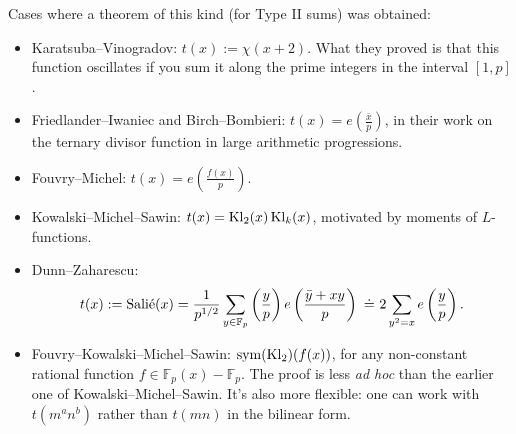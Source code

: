 \documentclass[reqno]{amsart} 
\numberwithin{theorem}{section}
\numberwithin{equation}{section}
\begin{document}
Cases where a theorem of this kind (for Type II sums) was obtained:
\begin{itemize}
\item Karatsuba--Vinogradov: $t(x) := \chi(x + 2)$.  What they proved is that this function oscillates if you sum it along the prime integers in the interval $[1, p]$.
\item Friedlander--Iwaniec and Birch--Bombieri: $t(x) = e(\tfrac{\bar{x}}{p})$, in their work on the ternary divisor function in large arithmetic progressions.
\item Fouvry--Michel: $t(x) = e \left( \frac{f(x)}{p} \right)$.
\item Kowalski--Michel--Sawin: $t(x) = \operatorname{Kl}_2(x) \operatorname{Kl}_k(x)$, motivated by moments of $L$-functions.
\item Dunn--Zaharescu:
  \begin{equation*}
    t(x) := \mathrm{Sali\acute{e}}(x) = \frac{1}{p^{1/2}} \sum_{y \in \mathbb{F}_p}
    \left( \frac{y}{p} \right)
    e \left( \frac{\bar{y} + x y}{p} \right)
    \,\,
    \dot{=}
    \,\,
    2
    \sum_{y^2 = x} e \left( \frac{y}{p} \right).
  \end{equation*}
\item Fouvry--Kowalski--Michel--Sawin: $\operatorname{sym}(\operatorname{Kl}_2)(f(x))$, for any non-constant rational function $f \in \mathbb{F}_p(x) - \mathbb{F}_p$.  The proof is less \emph{ad hoc} than the earlier one of Kowalski--Michel--Sawin.  It's also more flexible: one can work with $t(m^a n^b)$ rather than $t(m n)$ in the bilinear form.
\end{itemize}
\end{document}
